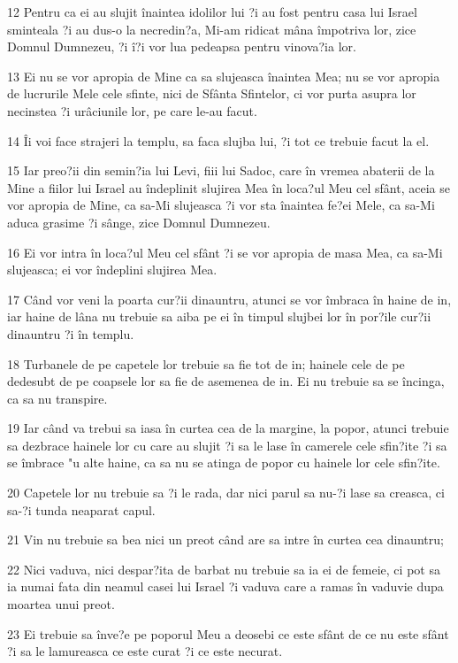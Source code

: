 \par 12 Pentru ca ei au slujit înaintea idolilor lui ?i au fost pentru casa lui Israel sminteala ?i au dus-o la necredin?a, Mi-am ridicat mâna împotriva lor, zice Domnul Dumnezeu, ?i î?i vor lua pedeapsa pentru vinova?ia lor.
\par 13 Ei nu se vor apropia de Mine ca sa slujeasca înaintea Mea; nu se vor apropia de lucrurile Mele cele sfinte, nici de Sfânta Sfintelor, ci vor purta asupra lor necinstea ?i urâciunile lor, pe care le-au facut.
\par 14 Îi voi face strajeri la templu, sa faca slujba lui, ?i tot ce trebuie facut la el.
\par 15 Iar preo?ii din semin?ia lui Levi, fiii lui Sadoc, care în vremea abaterii de la Mine a fiilor lui Israel au îndeplinit slujirea Mea în loca?ul Meu cel sfânt, aceia se vor apropia de Mine, ca sa-Mi slujeasca ?i vor sta înaintea fe?ei Mele, ca sa-Mi aduca grasime ?i sânge, zice Domnul Dumnezeu.
\par 16 Ei vor intra în loca?ul Meu cel sfânt ?i se vor apropia de masa Mea, ca sa-Mi slujeasca; ei vor îndeplini slujirea Mea.
\par 17 Când vor veni la poarta cur?ii dinauntru, atunci se vor îmbraca în haine de in, iar haine de lâna nu trebuie sa aiba pe ei în timpul slujbei lor în por?ile cur?ii dinauntru ?i în templu.
\par 18 Turbanele de pe capetele lor trebuie sa fie tot de in; hainele cele de pe dedesubt de pe coapsele lor sa fie de asemenea de in. Ei nu trebuie sa se încinga, ca sa nu transpire.
\par 19 Iar când va trebui sa iasa în curtea cea de la margine, la popor, atunci trebuie sa dezbrace hainele lor cu care au slujit ?i sa le lase în camerele cele sfin?ite ?i sa se îmbrace "u alte haine, ca sa nu se atinga de popor cu hainele lor cele sfin?ite.
\par 20 Capetele lor nu trebuie sa ?i le rada, dar nici parul sa nu-?i lase sa creasca, ci sa-?i tunda neaparat capul.
\par 21 Vin nu trebuie sa bea nici un preot când are sa intre în curtea cea dinauntru;
\par 22 Nici vaduva, nici despar?ita de barbat nu trebuie sa ia ei de femeie, ci pot sa ia numai fata din neamul casei lui Israel ?i vaduva care a ramas în vaduvie dupa moartea unui preot.
\par 23 Ei trebuie sa înve?e pe poporul Meu a deosebi ce este sfânt de ce nu este sfânt ?i sa le lamureasca ce este curat ?i ce este necurat.
